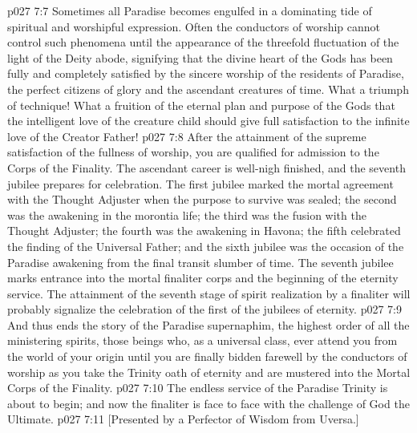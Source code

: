 \vs p027 7:7 Sometimes all Paradise becomes engulfed in a dominating tide of spiritual and worshipful expression. Often the conductors of worship cannot control such phenomena until the appearance of the threefold fluctuation of the light of the Deity abode, signifying that the divine heart of the Gods has been fully and completely satisfied by the sincere worship of the residents of Paradise, the perfect citizens of glory and the ascendant creatures of time. What a triumph of technique! What a fruition of the eternal plan and purpose of the Gods that the intelligent love of the creature child should give full satisfaction to the infinite love of the Creator Father!
\vs p027 7:8 \pc After the attainment of the supreme satisfaction of the fullness of worship, you are qualified for admission to the Corps of the Finality. The ascendant career is well\hyp{}nigh finished, and the seventh jubilee prepares for celebration. The first jubilee marked the mortal agreement with the Thought Adjuster when the purpose to survive was sealed; the second was the awakening in the morontia life; the third was the fusion with the Thought Adjuster; the fourth was the awakening in Havona; the fifth celebrated the finding of the Universal Father; and the sixth jubilee was the occasion of the Paradise awakening from the final transit slumber of time. The seventh jubilee marks entrance into the mortal finaliter corps and the beginning of the eternity service. The attainment of the seventh stage of spirit realization by a finaliter will probably signalize the celebration of the first of the jubilees of eternity.
\vs p027 7:9 \pc And thus ends the story of the Paradise supernaphim, the highest order of all the ministering spirits, those beings who, as a universal class, ever attend you from the world of your origin until you are finally bidden farewell by the conductors of worship as you take the Trinity oath of eternity and are mustered into the Mortal Corps of the Finality.
\vs p027 7:10 The endless service of the Paradise Trinity is about to begin; and now the finaliter is face to face with the challenge of God the Ultimate.
\vsetoff
\vs p027 7:11 [Presented by a Perfector of Wisdom from Uversa.]
